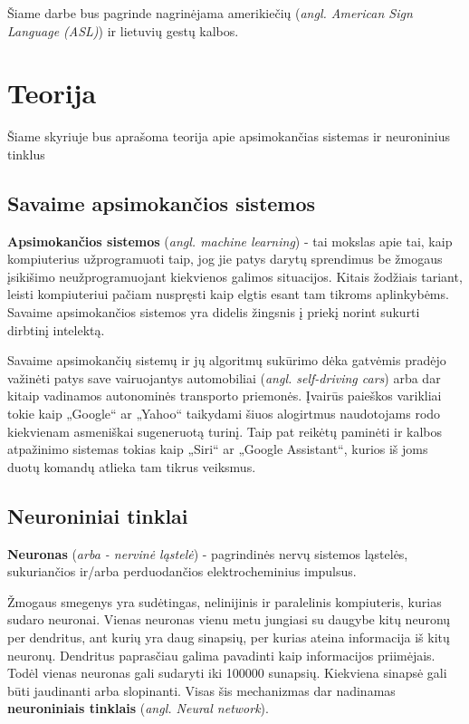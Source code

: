 \documentclass{VUMIFInfKursinis}
\begin{document}
Šiame darbe bus pagrinde nagrinėjama amerikiečių (\textit{angl. American Sign Language (ASL)}) ir lietuvių gestų kalbos.

\section{Teorija}
Šiame skyriuje bus aprašoma teorija apie apsimokančias sistemas ir neuroninius tinklus

\subsection{Savaime apsimokančios sistemos}
\textbf{Apsimokančios sistemos} (\textit{angl. machine learning}) - tai mokslas apie tai, kaip kompiuterius užprogramuoti taip, jog jie patys darytų sprendimus be žmogaus įsikišimo neužprogramuojant kiekvienos galimos situacijos. Kitais žodžiais tariant, leisti kompiuteriui pačiam nuspręsti kaip elgtis esant tam tikroms aplinkybėms. Savaime apsimokančios sistemos yra didelis žingsnis į priekį norint sukurti dirbtinį intelektą.

Savaime apsimokančių sistemų ir jų algoritmų sukūrimo dėka gatvėmis pradėjo važinėti patys save vairuojantys automobiliai (\textit{angl. self-driving cars}) arba dar kitaip vadinamos autonominės transporto priemonės. Įvairūs paieškos varikliai tokie kaip „Google“ ar „Yahoo“ taikydami šiuos alogirtmus naudotojams rodo kiekvienam asmeniškai sugeneruotą turinį. Taip pat reikėtų paminėti ir kalbos atpažinimo sistemas tokias kaip „Siri“ ar „Google Assistant“, kurios iš joms duotų komandų atlieka tam tikrus veiksmus.

\subsection{Neuroniniai tinklai}
\textbf{Neuronas} (\textit{arba - nervinė ląstelė}) - pagrindinės nervų sistemos ląstelės, sukuriančios ir/arba perduodančios elektrocheminius impulsus.


Žmogaus smegenys yra sudėtingas, nelinijinis ir paralelinis kompiuteris\cite{Hay09}, kurias sudaro neuronai. Vienas neuronas vienu metu jungiasi su daugybe kitų neuronų per dendritus, ant kurių yra daug sinapsių, per kurias ateina informacija iš kitų neuronų. Dendritus paprasčiau galima pavadinti kaip informacijos priimėjais. Todėl vienas neuronas gali sudaryti iki 100000 sunapsių. Kiekviena sinapsė gali būti jaudinanti arba slopinanti. Visas šis mechanizmas dar nadinamas \textbf{neuroniniais tinklais} (\textit{angl. Neural network}).
\end{document}
